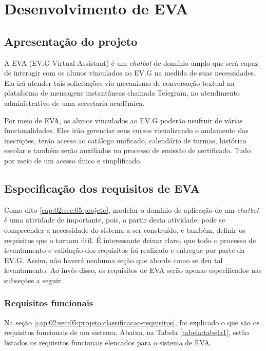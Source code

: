\chapter{Desenvolvimento de EVA}

\section{Apresentação do projeto}


A EVA (EV.G Virtual Assistant) é um \textit{chatbot} de domínio amplo que será capaz de interagir com os alunos vinculados ao EV.G na medida de suas necessidades.
Ela irá atender tais solicitações via mecanismo de conversação textual na plataforma de mensagens instantâneas chamada Telegram, no atendimento administrativo de uma secretaria acadêmica.

Por meio de EVA, os alunos vinculados ao EV.G poderão usufruir de várias funcionalidades.
Eles irão gerenciar seus cursos visualizando o andamento das inscrições, terão acesso ao catálogo unificado, calendário de turmas, histórico escolar e também serão auxiliados no processo de emissão de certificado. Tudo por meio de um acesso único e simplificado.

\section{Especificação dos requisitos de EVA}\label{especificacao-requisitos-eva}

Como dito \ref{cap:02:sec:05:projeto}, modelar o domínio de aplicação de um \textit{chatbot} é uma atividade de importante, pois, a partir desta atividade, pode se compreender a necessidade do sistema a ser construído, e também, definir os requisitos que o tornam útil.
É interessante deixar claro, que todo o processo de levantamento e validação dos requisitos foi realizado e entregue por parte da EV.G. Assim, não haverá nenhuma seção que aborde como se deu tal levantamento. Ao invés disso, os requisitos de EVA serão apenas especificados nas subseções a seguir.

\subsection{Requisitos funcionais}

Na seção \ref{cap:02:sec:05:projeto:classificacao-requisitos}, foi explicado o que são os requisitos funcionais de um sistema. Abaixo, na Tabela \ref{tabela:tabela1}, estão listados os requisitos funcionais elencados para o sistema de EVA.

